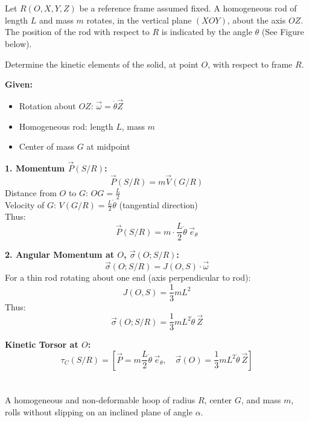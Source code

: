 \documentclass[12pt]{article}
\begin{document}
\section{}

Let $R(O, X, Y, Z)$ be a reference frame assumed fixed. A homogeneous rod of length $L$ and mass $m$ rotates, in the vertical plane $(XOY)$, about the axis $OZ$. The position of the rod with respect to $R$ is indicated by the angle $\theta$ (See Figure below).

Determine the kinetic elements of the solid, at point $O$, with respect to frame $R$.

\begin{correctionbox}
\textbf{Given:}
\begin{itemize}
    \item Rotation about $OZ$: $\vec{\omega} = \dot{\theta} \vec{Z}$
    \item Homogeneous rod: length $L$, mass $m$
    \item Center of mass $G$ at midpoint
\end{itemize}

\textbf{1. Momentum $\vec{P}(S/R)$:}
\[
\vec{P}(S/R) = m \vec{V}(G/R)
\]
Distance from $O$ to $G$: $OG = \frac{L}{2}$\\
Velocity of $G$: $V(G/R) = \frac{L}{2} \dot{\theta}$ (tangential direction)\\
Thus:
\[
\vec{P}(S/R) = m \cdot \frac{L}{2} \dot{\theta} \ \vec{e}_{\theta}
\]

\textbf{2. Angular Momentum at $O$, $\vec{\sigma}(O; S/R)$:}
\[
\vec{\sigma}(O; S/R) = J(O, S) \cdot \vec{\omega}
\]
For a thin rod rotating about one end (axis perpendicular to rod):
\[
J(O, S) = \frac{1}{3} m L^2
\]
Thus:
\[
\vec{\sigma}(O; S/R) = \frac{1}{3} m L^2 \dot{\theta} \ \vec{Z}
\]

\textbf{Kinetic Torsor at $O$:}
\[
\tau_C(S/R) = \left[ \vec{P} = m \frac{L}{2} \dot{\theta} \ \vec{e}_{\theta},\quad \vec{\sigma}(O) = \frac{1}{3} m L^2 \dot{\theta} \ \vec{Z} \right]
\]
\end{correctionbox}

\section{}

A homogeneous and non-deformable hoop of radius $R$, center $G$, and mass $m$, rolls without slipping on an inclined plane of angle $\alpha$.
\end{document}
